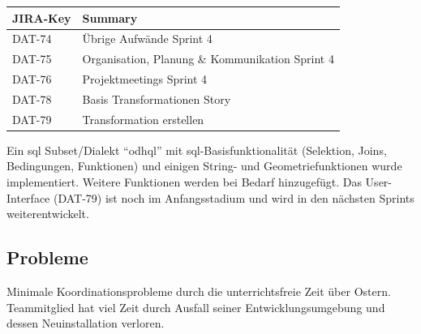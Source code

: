 \begin{table}[H]	
\centering
\begin{tabular}{ll}
	\toprule
	\textbf{JIRA-Key} & \textbf{Summary}\\
	\midrule
DAT-74 & Übrige Aufwände Sprint 4\\
DAT-75 & Organisation, Planung \& Kommunikation Sprint 4\\
DAT-76 & Projektmeetings Sprint 4\\
DAT-78 & Basis Transformationen	Story\\
DAT-79 & Transformation erstellen\\
	\bottomrule
\end{tabular}	
\end{table}

Ein \acs{sql} Subset/Dialekt ``\acs{odhql}'' mit \acs{sql}-Basisfunktionalität (Selektion, Joins, Bedingungen, Funktionen) und einigen String- und Geometriefunktionen wurde implementiert. Weitere Funktionen werden bei Bedarf hinzugefügt. Das User-Interface (DAT-79) ist noch im Anfangsstadium und wird in den nächsten Sprints weiterentwickelt.

\subsection*{Probleme}
Minimale Koordinationsprobleme durch die unterrichtsfreie Zeit über Ostern. Teammitglied \rlif hat viel Zeit durch Ausfall seiner Entwicklungsumgebung und dessen Neuinstallation verloren.
